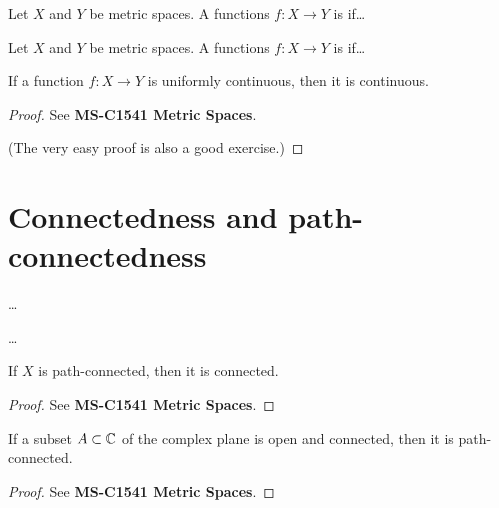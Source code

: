 \begin{definition}[Continuity]
  \label{def:continuous}
  Let $X$ and $Y$ be metric spaces.
  A functions $f \colon X \to Y$ is  if\ldots
\end{definition}

\begin{definition}
  \label{def:uniformly_continuous}
  Let $X$ and $Y$ be metric spaces.
  A functions $f \colon X \to Y$ is  if\ldots
\end{definition}

\begin{lemma}
  \label{lem:uniformly_continuous_implies_continuous}
  If a function $f \colon X \to Y$ is uniformly continuous, then it is continuous.
\end{lemma}
\begin{proof}
  See \textbf{MS-C1541 Metric Spaces}.

  (The very easy proof is also a good exercise.)
\end{proof}

\section{Connectedness and path-connectedness}

\begin{definition}[Connectedness]
  \label{def:connected}
  \ldots
\end{definition}

\begin{definition}
  \label{def:path_connected}
  \ldots
\end{definition}

\begin{lemma}
  \label{lem:path_connected_implies_connected}
  If $X$ is path-connected, then it is connected.
\end{lemma}
\begin{proof}
  See \textbf{MS-C1541 Metric Spaces}.
\end{proof}

\begin{lemma}
  \label{lem:connected_open_implies_path_connected}
  If a subset $A \subset \mathbb{C}$ of the complex plane is open
  and connected, then it is path-connected.
\end{lemma}
\begin{proof}
  See \textbf{MS-C1541 Metric Spaces}.
\end{proof}

